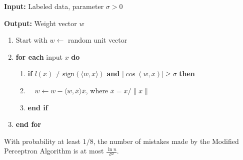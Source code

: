 \documentclass[main.tex]{subfiles}
\begin{document}
\begin{algorithm}
\textbf{Input:} Labeled data, parameter $\sigma > 0$

\textbf{Output:} Weight vector $w$

\begin{enumerate}
    \item Start with $w \leftarrow$ random unit vector
    \item \textbf{for each} input $x$ \textbf{do}
    \begin{enumerate}
        \item \textbf{if} $l(x) \neq \text{sign}(\langle w, x \rangle)$ \textbf{and} $|\cos(w, x)| \geq \sigma$ \textbf{then}
        \item $\quad w \leftarrow w - \langle w, \bar{x} \rangle \bar{x}$, where $\bar{x} = x/\|x\|$
        \item \textbf{end if}
    \end{enumerate}
    \item \textbf{end for}
\end{enumerate}
\end{algorithm}

\begin{theorem}
With probability at least $1/8$, the number of mistakes made by the Modified Perceptron Algorithm is at most $\frac{\ln n}{\sigma^2}$.
\end{theorem}
\end{document}
